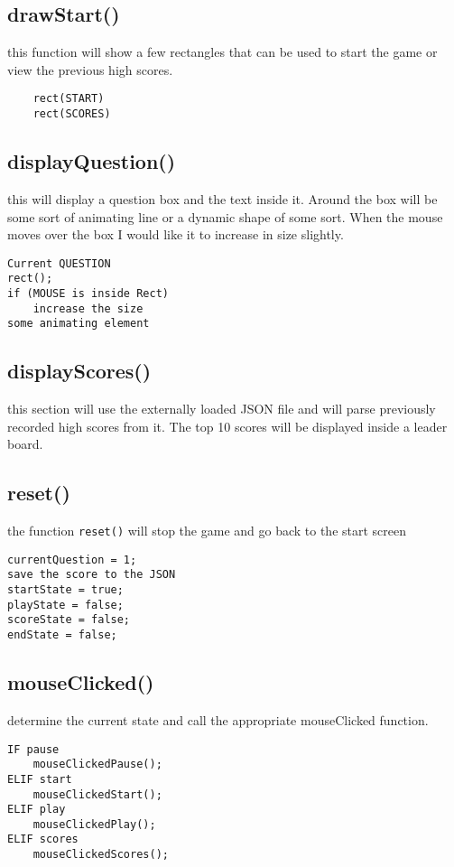 \documentclass[12 pt]{report}
\begin{document}
\subsection{drawStart()}
this function will show a few rectangles that can be used to start the game or view the previous high scores.
\begin{verbatim}
    rect(START)
    rect(SCORES)
\end{verbatim}

\subsection{displayQuestion()} 
this will display a question box and the text inside it. Around the box will be some sort of animating line or a dynamic shape of some sort. When the mouse moves over the box I would like it to increase in size slightly. 
\begin{verbatim}
Current QUESTION
rect();
if (MOUSE is inside Rect) 
    increase the size
some animating element
\end{verbatim}

\subsection{displayScores()} 
this section will use the externally loaded JSON file and will parse previously recorded high scores from it. The top 10 scores will be displayed inside a leader board.

\subsection{reset()}
the function \verb|reset()| will stop the game and go back to the start screen
\begin{verbatim}
currentQuestion = 1;
save the score to the JSON 
startState = true;
playState = false;
scoreState = false;
endState = false;
\end{verbatim}

\subsection{mouseClicked()} 
determine the current state and call the appropriate mouseClicked function.
\begin{verbatim}
IF pause
    mouseClickedPause();
ELIF start
    mouseClickedStart();
ELIF play
    mouseClickedPlay();
ELIF scores
    mouseClickedScores();
\end{verbatim}
\end{document}
